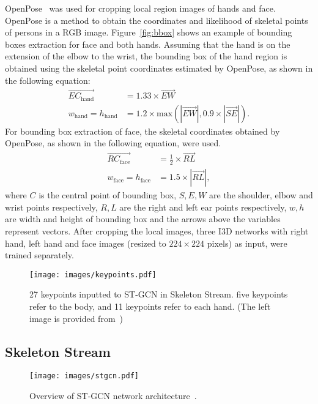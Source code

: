 \documentclass[journal]{IEEEtran}
\begin{document}
OpenPose~\cite{cao2017openpose} was used for cropping local region images of hands and face. OpenPose is a method to obtain the coordinates and likelihood of skeletal points of persons in a RGB image. Figure~\ref{fig:bbox} shows an example of bounding boxes extraction for face and both hands. Assuming that the hand is on the extension of the elbow to the wrist, the bounding box of the hand region is obtained using the skeletal point coordinates estimated by OpenPose, as shown in the following equation:
\begin{align}
    \overrightarrow{EC_\textrm{hand}} &= 1.33 \times \overrightarrow{EW} \\
    w_\textrm{hand} = h_\textrm{hand} &= 1.2 \times \textrm{max}(|\overrightarrow{EW}|, 0.9 \times |\overrightarrow{SE}|).
\end{align}
For bounding box extraction of face, the skeletal coordinates obtained by OpenPose, as shown in the following equation, were used.
\begin{align}
    \overrightarrow{RC_\textrm{face}} &= \frac{1}{2} \times \overrightarrow{RL} \\
    w_\textrm{face} = h_\textrm{face} &= 1.5 \times |\overrightarrow{RL}|,
\end{align}
where \(C\) is the central point of bounding box, \(S, E, W\) are the shoulder, elbow and wrist points respectively, \(R, L\) are the right and left ear points respectively, \(w, h\) are width and height of bounding box and the arrows above the variables represent vectors. After cropping the local images, three I3D networks with right hand, left hand and face images (resized to \(224\times224\) pixels) as input, were trained separately.
\fi


\begin{figure}[tb]
  \centering
    \texttt{[image: images/keypoints.pdf]}
    \caption{27 keypoints inputted to ST-GCN in Skeleton Stream. five keypoints refer to the body, and 11 keypoints refer to each hand. (The left image is provided from~\cite{vaezi2019ms-asl})}
    \label{fig:keypoints}
\end{figure}




\subsection{Skeleton Stream}

\begin{figure}[tb]
  \centering
    \texttt{[image: images/stgcn.pdf]}
    \caption{Overview of ST-GCN network architecture~\cite{yan2018stgcn}.}
    \label{fig:stgcn}
\end{figure}
\end{document}
